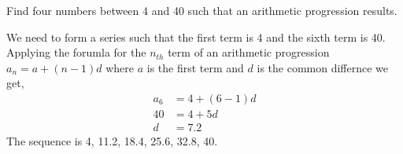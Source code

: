 
%
%
%
%
% 
% 

\question Find four numbers between 4 and 40 such that an arithmetic progression results.

\insertQR{}

\ifprintanswers
\fi 

\begin{solution}
  We need to form a series such that the first term is 4 and the sixth term is 40. Applying the forumla for the $n_{th}$ term of an arithmetic progression $a_n = a + (n-1)d$ where $a$ is the first term and $d$ is the common differnce we get,
  \begin{align}
    a_6 &= 4 + (6-1)d \\
    40  &= 4 + 5d \\
    d   &= 7.2
  \end{align}  
  The sequence is 4, 11.2, 18.4, 25.6, 32.8, 40.

\end{solution}
